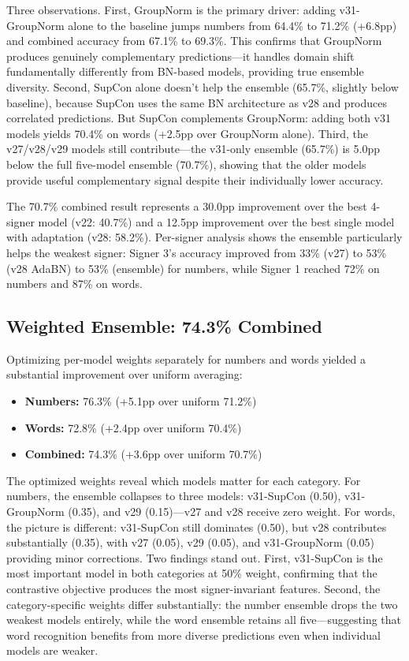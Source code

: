 \documentclass[conference]{IEEEtran}
\begin{document}
Three observations. First, GroupNorm is the primary driver: adding v31-GroupNorm alone to the baseline jumps numbers from 64.4\% to 71.2\% (+6.8pp) and combined accuracy from 67.1\% to 69.3\%. This confirms that GroupNorm produces genuinely complementary predictions---it handles domain shift fundamentally differently from BN-based models, providing true ensemble diversity. Second, SupCon alone doesn't help the ensemble (65.7\%, slightly below baseline), because SupCon uses the same BN architecture as v28 and produces correlated predictions. But SupCon complements GroupNorm: adding both v31 models yields 70.4\% on words (+2.5pp over GroupNorm alone). Third, the v27/v28/v29 models still contribute---the v31-only ensemble (65.7\%) is 5.0pp below the full five-model ensemble (70.7\%), showing that the older models provide useful complementary signal despite their individually lower accuracy.

The 70.7\% combined result represents a 30.0pp improvement over the best 4-signer model (v22: 40.7\%) and a 12.5pp improvement over the best single model with adaptation (v28: 58.2\%). Per-signer analysis shows the ensemble particularly helps the weakest signer: Signer 3's accuracy improved from 33\% (v27) to 53\% (v28 AdaBN) to 53\% (ensemble) for numbers, while Signer 1 reached 72\% on numbers and 87\% on words.

\subsection{Weighted Ensemble: 74.3\% Combined}
\label{sec:weighted_ensemble_results}

Optimizing per-model weights separately for numbers and words yielded a substantial improvement over uniform averaging:

\begin{itemize}
    \item \textbf{Numbers:} 76.3\% (+5.1pp over uniform 71.2\%)
    \item \textbf{Words:} 72.8\% (+2.4pp over uniform 70.4\%)
    \item \textbf{Combined:} 74.3\% (+3.6pp over uniform 70.7\%)
\end{itemize}

The optimized weights reveal which models matter for each category. For numbers, the ensemble collapses to three models: v31-SupCon (0.50), v31-GroupNorm (0.35), and v29 (0.15)---v27 and v28 receive zero weight. For words, the picture is different: v31-SupCon still dominates (0.50), but v28 contributes substantially (0.35), with v27 (0.05), v29 (0.05), and v31-GroupNorm (0.05) providing minor corrections. Two findings stand out. First, v31-SupCon is the most important model in both categories at 50\% weight, confirming that the contrastive objective produces the most signer-invariant features. Second, the category-specific weights differ substantially: the number ensemble drops the two weakest models entirely, while the word ensemble retains all five---suggesting that word recognition benefits from more diverse predictions even when individual models are weaker.
\end{document}

